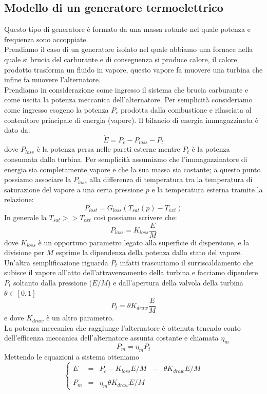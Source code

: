 \subsection{Modello di un generatore termoelettrico}
Questo tipo di generatore è formato da una massa rotante nel quale potenza e frequenza sono accoppiate.\\
Prendiamo il caso di un generatore isolato nel quale abbiamo una fornace nella quale si brucia del carburante e di conseguenza si produce calore, il calore prodotto trasforma un fluido in vapore, questo vapore fa muovere una turbina che infine fa muovere l'alternatore.\\
Prendiamo in considerazione come ingresso il sistema che brucia carburante e come uscita la potenza meccanica dell'alternatore. Per semplicità consideriamo come ingresso esogeno la potenza $P_c$ prodotta dalla combustione e rilasciata al contenitore principale di energia (vapore).
Il bilancio di energia immagazzinata è dato da:
$$\dot{E}= P_c-P_{loss}-P_t$$
dove $P_{loss}$ è la potenza persa nelle pareti esterne mentre $P_t$ è la potenza consumata dalla turbina.
Per semplicità assumiamo che l'immagazzinatore di energia sia completamente vapore e che la sua massa sia costante; a questo punto possiamo associare la $P_{loss}$ alla differenza di temperatura tra la temperatura di saturazione del vapore a una certa pressione $p$ e la temperatura esterna tramite la relazione:
$$P_{lost}=G_{loss}(T_{sat}(p)-T_{ext})$$
In generale la $T_{sat}>>T_{ext}$ così possiamo scrivere che:
$$P_{loss}=K_{loss}\frac{E}{M}$$
dove $K_{loss}$ è un opportuno parametro legato alla superficie di dispersione, e la divisione per $M$ esprime la dipendenza della potenza dallo stato del vapore.\\
Un'altra semplificazione riguarda $P_t$ infatti trascuriamo il surriscaldamento che subisce il vapore all'atto dell'attraversamento della turbina e facciamo dipendere $P_t$ soltanto dalla pressione ($E/M$) e dall'apertura della valvola della turbina $\theta \in [0,1]$
$$P_t=\theta K_{draw} \frac{E}{M}$$
e dove $K_{draw}$ è un altro parametro.\\
La potenza meccanica che raggiunge l'alternatore è ottenuta tenendo conto dell'efficenza meccanica dell'alternatore assunta costante e chiamata $\eta_m$
$$P_m=\eta_m P_t$$
Mettendo le equazioni a sistema otteniamo
\begin{equation}
\left\{
\begin{array}{ccccc}
\dot{E}&=&P_c-K_{loss}E/M&-&\theta K_{draw}E/M\\
\\
P_m&=&\eta_m\theta K_{draw}E/M&&
\end{array}
\right.
\end{equation}
